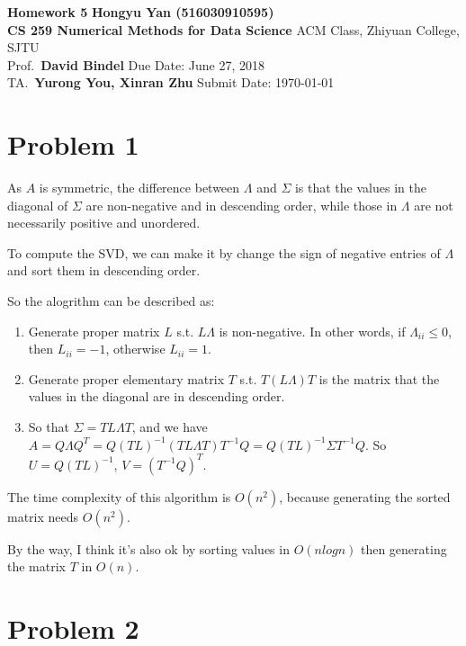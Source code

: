 \documentclass[a4paper, 11pt]{article}
\begin{document}
\noindent
\large\textbf{Homework 5} \hfill \textbf{Hongyu Yan (516030910595)} \\
\normalsize {\bf CS 259 Numerical Methods for Data Science} \hfill ACM Class, Zhiyuan College, SJTU\\
Prof.~{\bf David Bindel} \hfill Due Date: June 27, 2018\\
TA.~{\bf Yurong You, Xinran Zhu} \hfill Submit Date: \today

\section*{Problem 1}
As $A$ is symmetric, the difference between $\Lambda$ and $\Sigma$ is that
the values in the diagonal of $\Sigma$ are non-negative and in descending order,
while those in $\Lambda$ are not necessarily positive and unordered.

To compute the SVD, we can make it by change the sign of negative entries of $\Lambda$
and sort them in descending order.

So the alogrithm can be described as:
\begin{enumerate}
\item Generate proper matrix $L$ s.t. $L\Lambda$ is non-negative. In other words, if $\Lambda_{ii} \leq 0$, then $L_{ii} = -1$, otherwise $L_{ii} = 1$.
\item Generate proper elementary matrix $T$ s.t. $T(L\Lambda)T$ is the matrix that
the values in the diagonal are in descending order.
\item So that $\Sigma = TL\Lambda T$, and we have $A = Q\Lambda Q^T = Q(TL)^{-1}(TL\Lambda T)T^{-1}Q = Q(TL)^{-1}\Sigma T^{-1}Q$. So $U = Q(TL)^{-1}$, $V=(T^{-1}Q)^T$.
\end{enumerate}
The time complexity of this algorithm is $O(n^2)$, because generating the sorted matrix needs $O(n^2)$.

By the way, I think it's also ok by sorting values in $O(nlogn)$ then generating the matrix $T$ in $O(n)$.
\section*{Problem 2}
\end{document}
